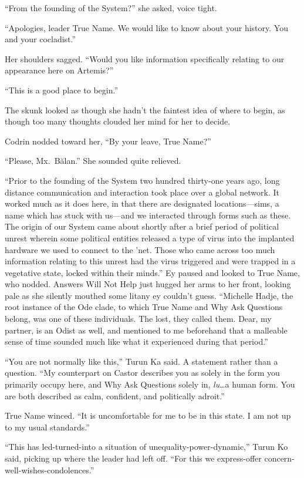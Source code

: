``From the founding of the System?'' she asked, voice tight.

``Apologies, leader True Name. We would like to know about your history. You and your cocladist.''

Her shoulders sagged. ``Would you like information specifically relating to our appearance here on Artemis?''

``This is a good place to begin.''

The skunk looked as though she hadn't the faintest idea of where to begin, as though too many thoughts clouded her mind for her to decide.

Codrin nodded toward her, ``By your leave, True Name?''

``Please, Mx.~Bălan.'' She sounded quite relieved.

``Prior to the founding of the System two hundred thirty-one years ago, long distance communication and interaction took place over a global network. It worked much as it does here, in that there are designated locations—sims, a name which has stuck with us—and we interacted through forms such as these. The origin of our System came about shortly after a brief period of political unrest wherein some political entities released a type of virus into the implanted hardware we used to connect to the 'net. Those who came across too much information relating to this unrest had the virus triggered and were trapped in a vegetative state, locked within their minds.'' Ey paused and looked to True Name, who nodded. Answers Will Not Help just hugged her arms to her front, looking pale as she silently mouthed some litany ey couldn't guess. ``Michelle Hadje, the root instance of the Ode clade, to which True Name and Why Ask Questions belong, was one of these individuals. The lost, they called them. Dear, my partner, is an Odist as well, and mentioned to me beforehand that a malleable sense of time sounded much like what it experienced during that period.''

``You are not normally like this,'' Turun Ka said. A statement rather than a question. ``My counterpart on Castor describes you as solely in the form you primarily occupy here, and Why Ask Questions solely in, \emph{lu}\ldots a human form. You are both described as calm, confident, and politically adroit.''

True Name winced. ``It is uncomfortable for me to be in this state. I am not up to my usual standards.''

``This has led-turned-into a situation of unequality-power-dynamic,'' Turun Ko said, picking up where the leader had left off. ``For this we express-offer concern-well-wishes-condolences.''


